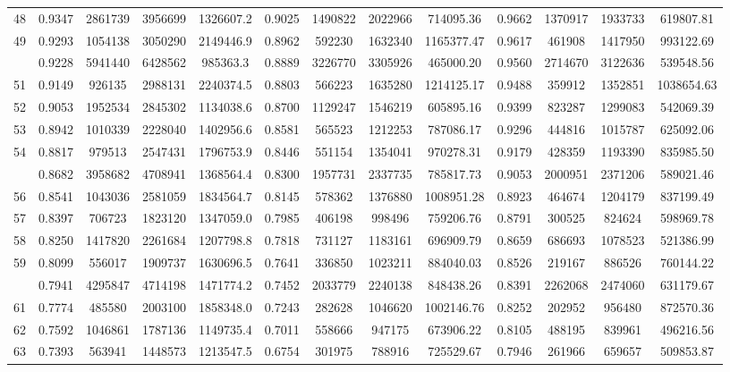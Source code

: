 \documentclass[
  12pt,
]{article}
\begin{document}
\begin{longtable}[t]{lcccccccccccc}
48 & 0.9347 & 2861739 & 3956699 & 1326607.2 & 0.9025 & 1490822 & 2022966 & 714095.36 & 0.9662 & 1370917 & 1933733 & 619807.81\\
49 & 0.9293 & 1054138 & 3050290 & 2149446.9 & 0.8962 & 592230 & 1632340 & 1165377.47 & 0.9617 & 461908 & 1417950 & 993122.69\\
\addlinespace
50 & 0.9228 & 5941440 & 6428562 & 985363.3 & 0.8889 & 3226770 & 3305926 & 465000.20 & 0.9560 & 2714670 & 3122636 & 539548.56\\
51 & 0.9149 & 926135 & 2988131 & 2240374.5 & 0.8803 & 566223 & 1635280 & 1214125.17 & 0.9488 & 359912 & 1352851 & 1038654.63\\
52 & 0.9053 & 1952534 & 2845302 & 1134038.6 & 0.8700 & 1129247 & 1546219 & 605895.16 & 0.9399 & 823287 & 1299083 & 542069.39\\
53 & 0.8942 & 1010339 & 2228040 & 1402956.6 & 0.8581 & 565523 & 1212253 & 787086.17 & 0.9296 & 444816 & 1015787 & 625092.06\\
54 & 0.8817 & 979513 & 2547431 & 1796753.9 & 0.8446 & 551154 & 1354041 & 970278.31 & 0.9179 & 428359 & 1193390 & 835985.50\\
\addlinespace
55 & 0.8682 & 3958682 & 4708941 & 1368564.4 & 0.8300 & 1957731 & 2337735 & 785817.73 & 0.9053 & 2000951 & 2371206 & 589021.46\\
56 & 0.8541 & 1043036 & 2581059 & 1834564.7 & 0.8145 & 578362 & 1376880 & 1008951.28 & 0.8923 & 464674 & 1204179 & 837199.49\\
57 & 0.8397 & 706723 & 1823120 & 1347059.0 & 0.7985 & 406198 & 998496 & 759206.76 & 0.8791 & 300525 & 824624 & 598969.78\\
58 & 0.8250 & 1417820 & 2261684 & 1207798.8 & 0.7818 & 731127 & 1183161 & 696909.79 & 0.8659 & 686693 & 1078523 & 521386.99\\
59 & 0.8099 & 556017 & 1909737 & 1630696.5 & 0.7641 & 336850 & 1023211 & 884040.03 & 0.8526 & 219167 & 886526 & 760144.22\\
\addlinespace
60 & 0.7941 & 4295847 & 4714198 & 1471774.2 & 0.7452 & 2033779 & 2240138 & 848438.26 & 0.8391 & 2262068 & 2474060 & 631179.67\\
61 & 0.7774 & 485580 & 2003100 & 1858348.0 & 0.7243 & 282628 & 1046620 & 1002146.76 & 0.8252 & 202952 & 956480 & 872570.36\\
62 & 0.7592 & 1046861 & 1787136 & 1149735.4 & 0.7011 & 558666 & 947175 & 673906.22 & 0.8105 & 488195 & 839961 & 496216.56\\
63 & 0.7393 & 563941 & 1448573 & 1213547.5 & 0.6754 & 301975 & 788916 & 725529.67 & 0.7946 & 261966 & 659657 & 509853.87\\

\end{longtable}
\end{document}

